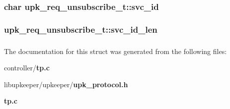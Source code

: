 \subsubsection[{svc\_\-id}]{\setlength{\rightskip}{0pt plus 5cm}char {\bf upk\_\-req\_\-unsubscribe\_\-t::svc\_\-id}}\label{structupk__req__unsubscribe__t_ab3f4095f177fb929fcd59944968a8a67}
\subsubsection[{svc\_\-id\_\-len}]{ {\bf upk\_\-req\_\-unsubscribe\_\-t::svc\_\-id\_\-len}}\label{structupk__req__unsubscribe__t_aafaf3c961187b79c9f292ec50c0d312a}
\subsubsection[{UPK\_\-V0\_\-REQ\_\-UNSUBS\_\-T\_\-FIELDS}]{}\label{structupk__req__unsubscribe__t_ada8e9bdec7dc31dabccca69f374e5573}


The documentation for this struct was generated from the following files:\begin{DoxyCompactItemize}
\item 
controller/{\bf tp.c}\item 
libupkeeper/upkeeper/{\bf upk\_\-protocol.h}\item 
{\bf tp.c}\end{DoxyCompactItemize}
